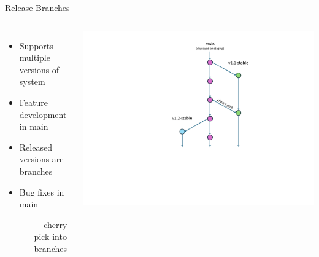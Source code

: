\documentclass{slide}
\begin{document}

\begin{frame}{Release Branches \cite{gitlab-flow}}
    \vspace{1pt}
    \begin{columns}
      \vspace{-5mm}
      {\LARGE
        \vspace{-2em}
        \begin{itemize}
            \item { Supports multiple versions of system\\}
            \item Feature development in main
            \item Released versions are branches
            \vspace{3mm}
            \item Bug fixes in main
            \begin{itemize}
                \Large\item[$-$] cherry-pick into branches
            \end{itemize}
        \end{itemize}
      }
        \centering
        \includegraphics[trim=255 130 125 33,clip,height=\textheight]{diagrams/branching-diagrams/release-branches}
    \end{columns}
\end{frame}
\end{document}
